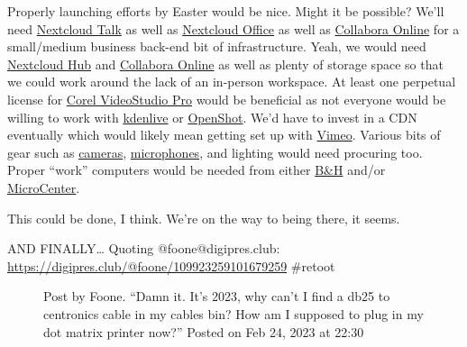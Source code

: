 Properly launching efforts by Easter would be nice. Might it be
possible? We'll need \href{https://nextcloud.com/talk/}{Nextcloud Talk}
as well as \href{https://nextcloud.com/groupware/}{Nextcloud Office} as
well as
\href{https://www.collaboraoffice.com/collabora-online/}{Collabora
Online} for a small/medium business back-end bit of infrastructure.
Yeah, we would need \href{https://nextcloud.com/hub/}{Nextcloud Hub} and
\href{https://www.collaboraoffice.com/collabora-online/}{Collabora
Online} as well as plenty of storage space so that we could work around
the lack of an in-person workspace. At least one perpetual license for
\href{https://www.videostudiopro.com/en/licensing/business/}{Corel
VideoStudio Pro} would be beneficial as not everyone would be willing to
work with \href{https://kdenlive.org/en/}{kdenlive} or
\href{https://www.openshot.org/}{OpenShot}. We'd have to invest in a CDN
eventually which would likely mean getting set up with
\href{https://vimeo.com/ott/resources/}{Vimeo}. Various bits of gear
such as
\href{https://www.bhphotovideo.com/c/products/Pro-Camcorders-Cameras/ci/1881?sort=PRICE_LOW_TO_HIGH&filters=fct_a_features_2248\%3Alive-streaming-capability\%2Cfct_digital-interface_2247\%3Ahdmi\%7Cusb-c\%2Cfct_mic-input-hidden_6493\%3A3.5mm\%2Cfct_sensor-size_7003\%3A1-2.3in\%7C1-2in\%7C1-inch\%2Cfct_system-type_2110\%3Antsc}{cameras},
\href{https://www.bhphotovideo.com/c/search?q=camcorder\%20mic&sort=PRICE_LOW_TO_HIGH&filters=fct_a_power-source_1353\%3Abattery\%2Cfct_category\%3Ashotgun_8533\%2Cfct_connector-type_4116\%3A1-8in-mini\%2Cfct_integrated-mount_7062\%3Ayes\%2Cfct_stereo-mono_1411\%3Astereo}{microphones},
and lighting would need procuring too. Proper ``work'' computers would
be needed from either
\href{https://www.bhphotovideo.com/c/products/Windows-Computers/ci/16360/cp/28407\%2B50992\%2B16360?sort=PRICE_LOW_TO_HIGH&filters=fct_a_wireless_974\%3Awi-fi-6-802.11ax\%2Cfct_capacity_967\%3A1.5tb\%7C1tb\%7C2tb\%2Cfct_drive-speed-type_966\%3Aflash-ssd\%2Cfct_external-ports_2740\%3Adisplayport\%7Cusb-2.0\%7Cusb-3.1-gen-2-type-a\%7Cusb-3.2-gen-2x2-type-c\%2Cfct_operating-system_970\%3Awindows-11-pro\%2Cfct_processor_7612\%3Aintel-core-i9-16-core-12th-gen\%2Cfct_ram_965\%3A32gb\%7C64gb}{B\&H}
and/or
\href{https://www.microcenter.com/search/search_results.aspx?N=4294967292+4294810848+4294817200+4294807310+4294811342+4294811030+4294808991+4294816371+4294808842+4294810314+4294810627+4294817474+4294809073&NTK=all&sortby=pricelow}{MicroCenter}.

This could be done, I think. We're on the way to being there, it seems.

AND FINALLY\ldots{} Quoting @foone@digipres.club:
\url{https://digipres.club/@foone/109923259101679259} \#retoot

\begin{figure}
\centering
{}
\caption{Post by Foone. ``Damn it. It's 2023, why can't I find a db25 to
centronics cable in my cables bin? How am I supposed to plug in my dot
matrix printer now?'' Posted on Feb 24, 2023 at 22:30}
\end{figure}
